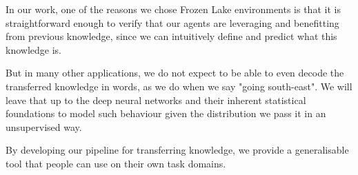 In our work, one of the reasons we chose Frozen Lake environments is that it is straightforward enough to verify that our agents are leveraging and benefitting from previous knowledge, since we can intuitively define and predict what this knowledge is.

But in many other applications, we do not expect to be able to even decode the transferred knowledge in words, as we do when we say "going south-east". We will leave that up to the deep neural networks and their inherent statistical foundations to model such behaviour given the distribution we pass it in an unsupervised way.

By developing our pipeline for transferring knowledge, we provide a generalisable tool that people can use on their own task domains.

